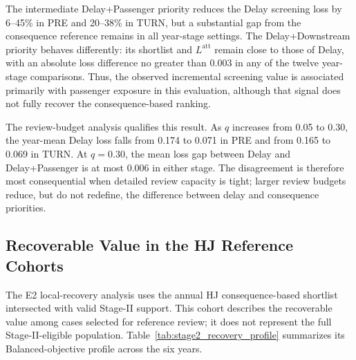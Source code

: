 The intermediate Delay+Passenger priority reduces the Delay screening loss by 6--45\% in PRE and 20--38\% in TURN, but a substantial gap from the consequence reference remains in all year-stage settings. The Delay+Downstream priority behaves differently: its shortlist and $L^{\mathrm{att}}$ remain close to those of Delay, with an absolute loss difference no greater than 0.003 in any of the twelve year-stage comparisons. Thus, the observed incremental screening value is associated primarily with passenger exposure in this evaluation, although that signal does not fully recover the consequence-based ranking.

The review-budget analysis qualifies this result. As $q$ increases from 0.05 to 0.30, the year-mean Delay loss falls from 0.174 to 0.071 in PRE and from 0.165 to 0.069 in TURN. At $q=0.30$, the mean loss gap between Delay and Delay+Passenger is at most 0.006 in either stage. The disagreement is therefore most consequential when detailed review capacity is tight; larger review budgets reduce, but do not redefine, the difference between delay and consequence priorities.

\subsection{Recoverable Value in the HJ Reference Cohorts}
\label{subsec:results_local_recovery}

The E2 local-recovery analysis uses the annual HJ consequence-based shortlist intersected with valid Stage-II support. This cohort describes the recoverable value among cases selected for reference review; it does not represent the full Stage-II-eligible population. Table~\ref{tab:stage2_recovery_profile} summarizes its Balanced-objective profile across the six years.

